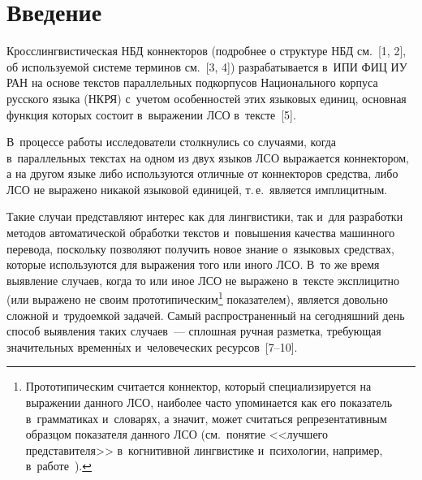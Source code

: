 
  
\vspace*{-2pt}



\thispagestyle{headings}

\begin{multicols}{2}

\label{st\stat}
   
\section{Введение}

   Кросслингвистическая НБД коннекторов (подробнее о структуре НБД 
см.~[1, 2], об использу\-емой системе терминов см.~[3, 4]) разрабатывается 
в~ИПИ ФИЦ ИУ РАН на основе текстов параллельных подкорпусов 
Национального корпуса русского языка (НКРЯ) с~учетом особенностей этих 
языковых единиц, основная функция которых состоит в~выражении  
ЛСО в~тексте~[5]. 

В~процессе 
работы исследователи столкнулись со случаями, когда в~параллельных 
текстах на одном из двух языков ЛСО выражается коннектором, а на другом 
языке либо используются отличные от коннекторов средства, либо ЛСО не 
выражено никакой языковой единицей, т.\,е.\ является имплицитным. 

Такие 
случаи представляют интерес как для лингвистики, так и~для разработки 
методов автоматической обработки текстов и~повышения качества 
машинного перевода, поскольку позволяют получить новое знание 
о~языковых средствах, которые используются для выражения того или иного 
ЛСО. В~то же время выявление случаев, когда то или иное ЛСО не выражено 
в~тексте эксплицитно (или выражено не своим 
прототипическим\footnote[3]{Прототипическим считается коннектор, который 
специализируется на выражении данного ЛСО, наиболее часто упоминается как его показатель 
в~грамматиках и~словарях, а значит, может считаться репрезентативным образцом показателя 
данного ЛСО (см.\ понятие <<лучшего представителя>> в~когнитивной лингвистике и~психологии, 
например, в~работе~\cite{6-in}).} показателем), является довольно сложной 
и~трудоемкой задачей. Самый распространенный на сегодняшний день 
способ выявления таких случаев~--- сплошная ручная разметка, требующая 
значительных временн$\acute{\mbox{ы}}$х и~человеческих ресурсов~[7--10].
   

\end{multicols}
